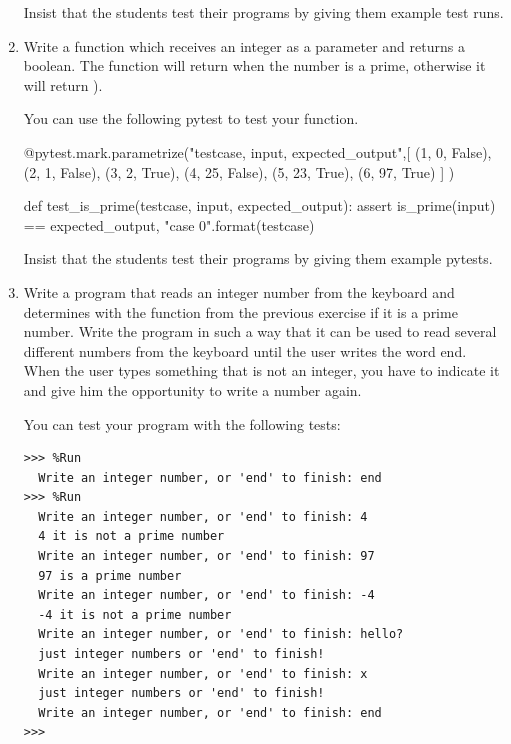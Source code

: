 \documentclass[
  fontsize=10pt,
  a4paper,
]{scrartcl}
\newenvironment{howTILEd}%
  {\begin{mdframed}[skipabove=10pt,skipbelow=10pt,backgroundcolor=pink!40]}%
  {\end{mdframed}}
\begin{document}
\begin{enumerate}
\begin{howTILEd}
Insist that the students test their programs by giving them example test runs.
\end{howTILEd}


\item Write a function  which receives an integer as a parameter and returns a boolean. The function will return  when the number is a prime, otherwise it will return ). 

You can use the following pytest to test your function.

\begin{python}
@pytest.mark.parametrize("testcase, input, expected_output",[
    (1, 0, False),
    (2, 1, False),
    (3, 2, True),
    (4, 25, False),
    (5, 23, True),
    (6, 97, True)
    ]
)

def test_is_prime(testcase, input, expected_output):
    assert is_prime(input) == expected_output, "case {0}".format(testcase)
\end{python}

\begin{howTILEd}
Insist that the students test their programs by giving them example pytests.
\end{howTILEd}


\item Write a program that reads an integer number from the keyboard and determines with the function  from the previous exercise if it is a prime number. Write the program in such a way that it can be used to read several different numbers from the keyboard until the user writes the word end. When the user types something that is not an integer, you have to indicate it and give him the opportunity to write a number again.

You can test your program with the following tests:

\begin{Verbatim}[frame=single, label={\em ejemlos de test ejecuciones}]
>>> %Run 
  Write an integer number, or 'end' to finish: end
>>> %Run 
  Write an integer number, or 'end' to finish: 4
  4 it is not a prime number
  Write an integer number, or 'end' to finish: 97
  97 is a prime number
  Write an integer number, or 'end' to finish: -4
  -4 it is not a prime number
  Write an integer number, or 'end' to finish: hello?
  just integer numbers or 'end' to finish!
  Write an integer number, or 'end' to finish: x
  just integer numbers or 'end' to finish!
  Write an integer number, or 'end' to finish: end
>>> 
\end{Verbatim}


\end{enumerate}
\end{document}
